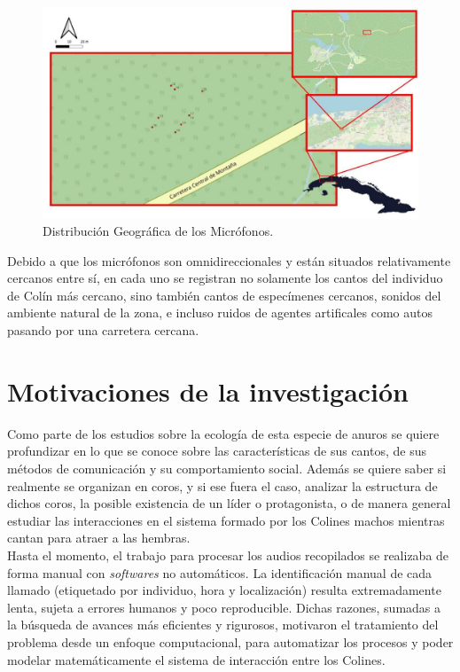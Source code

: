 \begin{figure}[h!]
    \centering
    \includegraphics[width=\columnwidth]{Graphics/mic_map.jpg}
    \caption{Distribución Geográfica de los Micrófonos.}
    \label{fig:map}
\end{figure}

Debido a que los micrófonos son omnidireccionales y están situados 
relativamente cercanos entre sí, en cada uno se registran no solamente
los cantos del individuo de Colín más cercano, sino también cantos de especímenes
cercanos, sonidos del ambiente natural de la zona, e incluso ruidos de 
agentes artificales como autos pasando por una carretera cercana.



\section{Motivaciones de la investigación}

Como parte de los estudios sobre la ecología de esta especie de anuros
se quiere profundizar en lo que se conoce sobre las características de sus cantos,
de sus métodos de comunicación y su comportamiento social. Además se quiere 
saber si realmente se organizan en coros, y si ese fuera el caso, analizar la
estructura de dichos coros, la posible existencia de un líder o protagonista,
o de manera general estudiar las interacciones en el sistema formado por los Colines
machos mientras cantan para atraer a las hembras.\\

Hasta el momento, el trabajo para procesar los audios recopilados se realizaba de forma manual
con \emph{softwares} no automáticos. La identificación manual de cada llamado (etiquetado por 
individuo, hora y localización) resulta extremadamente lenta, 
sujeta a errores humanos y poco reproducible. Dichas razones,
sumadas a la búsqueda de avances más eficientes y rigurosos, motivaron el tratamiento
del problema desde un enfoque computacional, para automatizar los procesos
y poder modelar matemáticamente el sistema de interacción entre los Colines.\\ 


